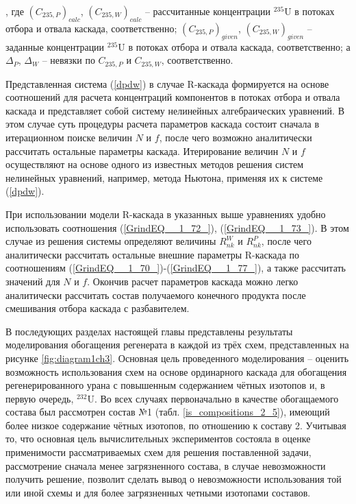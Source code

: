 , где ${(C_{235, P})}_{calc}$, ${(C_{235, W})}_{calc}$ -- рассчитанные концентрации $^{235}$U в потоках отбора и отвала каскада, соответственно; ${(C_{235, P})}_{given}$, ${(C_{235, W})}_{given}$ -- заданные концентрации $^{235}$U в потоках отбора и отвала каскада, соответственно; а $\Delta_{P}$, $\Delta_{W}$ -- невязки по $C_{235, P}$ и $C_{235, W}$, соответственно. 

Представленная система (\ref{dpdw}) в случае R-каскада формируется на основе соотношений для расчета концентраций компонентов в потоках отбора и отвала каскада и представляет собой систему нелинейных алгебраических уравнений. В этом случае суть процедуры расчета параметров каскада состоит сначала в итерационном поиске величин $N$ и $f$, после чего возможно аналитически рассчитать остальные параметры каскада. Итерирование величин $N$ и $f$ осуществляют на основе одного из известных методов решения систем нелинейных уравнений, например, метода Ньютона, применяя их к системе (\ref{dpdw}). 

При использовании модели R-каскада в указанных выше уравнениях удобно использовать соотношения (\ref{GrindEQ__1_72_}), (\ref{GrindEQ__1_73_}). В этом случае из решения системы определяют величины $R_{n k}^{W}$ и $R_{n k}^{P}$, после чего аналитически рассчитать остальные внешние параметры R-каскада по соотношениям (\ref{GrindEQ__1_70_})-(\ref{GrindEQ__1_77_}), а также рассчитать значений для $N$ и $f$. Окончив расчет параметров каскада можно легко аналитически рассчитать состав получаемого конечного продукта после смешивания отбора каскада с разбавителем.

В последующих разделах настоящей главы представлены результаты моделирования обогащения регенерата в каждой из трёх схем, представленных на рисунке \ref{fig:diagram1ch3}. 
Основная цель проведенного моделирования -- оценить возможность использования схем на основе ординарного каскада для обогащения регенерированного урана с повышенным содержанием чётных изотопов и, в первую очередь, $^{232}$U. Во всех случаях первоначально в качестве обогащаемого состава был рассмотрен состав №1 (табл. \ref{is_compositions_2_5}), имеющий более низкое содержание чётных изотопов, по отношению к составу 2. Учитывая то, что основная цель вычислительных экспериментов состояла в оценке применимости рассматриваемых схем для решения поставленной задачи, рассмотрение сначала менее загрязненного состава, в случае невозможности получить решение, позволит сделать вывод о невозможности использования той или иной схемы и для более загрязненных четными изотопами составов.

